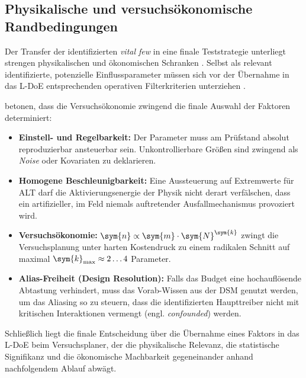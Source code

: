 \subsection{Physikalische und versuchsökonomische Randbedingungen} \label{sec:screening_randbedingungen}

Der Transfer der identifizierten \textit{vital few} in eine finale Teststrategie unterliegt strengen physikalischen und ökonomischen Schranken \cite{Gundlach.2004,Klein.2011}.
Selbst als relevant identifizierte, potenzielle Einflussparameter müssen sich vor der Übernahme in das \ac{L-DoE} entsprechenden operativen Filterkriterien unterziehen \cite{Montgomery.2020,Siebertz.2017}.

\textcite{Arndt.2023c} betonen, dass die Versuchsökonomie zwingend die finale Auswahl der Faktoren determiniert:
\begin{itemize}
    \item \textbf{Einstell- und Regelbarkeit:} Der Parameter muss am Prüfstand absolut reproduzierbar ansteuerbar sein. Unkontrollierbare Größen sind zwingend als \textit{Noise} oder Kovariaten zu deklarieren.
    \item \textbf{Homogene Beschleunigbarkeit:} Eine Aussteuerung auf Extremwerte für \ac{ALT} darf die Aktivierungsenergie der Physik nicht derart verfälschen, dass ein artifizieller, im Feld niemals auftretender Ausfallmechanismus provoziert wird.
    \item \textbf{Versuchsökonomie:} $\sym{n} \propto {\sym{m}\cdot\sym{N}}^{\sym{k}}$ zwingt die Versuchsplanung unter harten Kostendruck zu einem radikalen Schnitt auf maximal $\sym{k}_{\max} \approx 2 \dots 4$ Parameter.
    \item \textbf{Alias-Freiheit (Design Resolution):} Falls das Budget eine hochauflösende Abtastung verhindert, muss das Vorab-Wissen aus der \ac{DSM} genutzt werden, um das Aliasing so zu steuern, dass die identifizierten Haupttreiber nicht mit kritischen Interaktionen vermengt (engl. \textit{confounded}) werden.
\end{itemize}
Schließlich liegt die finale Entscheidung über die Übernahme eines Faktors in das \ac{L-DoE} beim Versuchsplaner, der die physikalische Relevanz, die statistische Signifikanz und die ökonomische Machbarkeit gegeneinander anhand nachfolgendem Ablauf abwägt.
